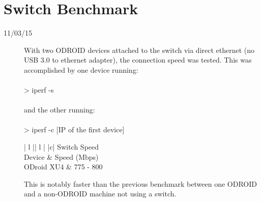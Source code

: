 \section{Switch Benchmark}
\begin{description}
\item [11/03/15] With two ODROID devices attached to the switch via direct ethernet (no USB 3.0 to ethernet adapter), the connection speed was tested. This was accomplished by one device running: \\ \\
> iperf -s \\ \\
and the other running: \\ \\
> iperf -c [IP of the first device]

\begin{center}
\begin{tabular}{ | l || l | }
\hline
{}
{ |c| }{ Switch Speed } \\
\hline
Device & Speed (Mbps) \\
\hline
ODroid XU4 & 775 - 800 \\
\hline
\end{tabular}
\end{center}

This is notably faster than the previous benchmark between one ODROID and a non-ODROID machine not using a switch.
\end{description}

